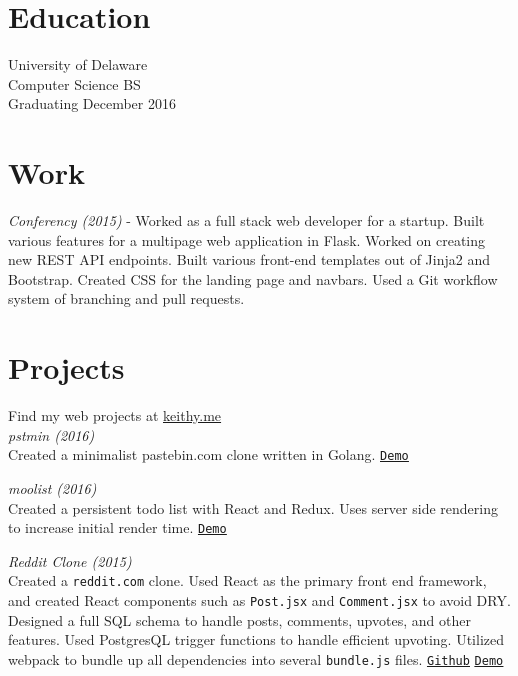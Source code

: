 \documentclass[margin]{res}
\begin{document}

\address{{\bf Address}\\346 Nicholas Ct \\Wilmington, DE 19808\\(302) 887-0387}
\address{{\bf Links}\\\url{terda12@gmail.com}\\\url{github.com/keithyong}\\\url{keithy.me}}

\begin{resume}

\section{Education}
University of Delaware\\
Computer Science BS\\
Graduating December 2016

\section{Work}
\textit{Conferency (2015)} - Worked as a full stack web developer for a startup. Built various features for a multipage web application in Flask. Worked on creating new REST API endpoints. Built various front-end templates out of Jinja2 and Bootstrap. Created CSS for the landing page and navbars. Used a Git workflow system of branching and pull requests.

\section{Projects}

Find my web projects at \underline{\url{keithy.me}}\\
\textit{pstmin (2016)}\\ Created a minimalist pastebin.com clone written in Golang. \underline{\texttt{\href{http://www.pstmin.com}{Demo}}}

\textit{moolist (2016)}\\ Created a persistent todo list with React and Redux. Uses server side rendering to increase initial render time. \underline{\texttt{\href{http://http://moolist.keithy.me}{Demo}}}

\textit{Reddit Clone (2015)}\\ Created a \texttt{reddit.com} clone. Used React as the primary front end framework, and created React components such as \texttt{Post.jsx} and \texttt{Comment.jsx} to avoid DRY. Designed a full SQL schema to handle posts, comments, upvotes, and other features. Used PostgresQL trigger functions to handle efficient upvoting. Utilized webpack to bundle up all dependencies into several \texttt{bundle.js} files. \underline{\texttt{\href{https://github.com/keithyong/pyramus}{Github}}} \underline{\texttt{\href{http://pyramus.keithy.me}{Demo}}}


\end{resume}
\end{document}
